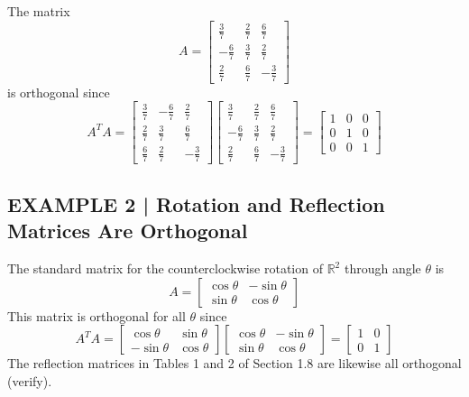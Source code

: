 \documentclass{article}
\theoremstyle{mystyle}
\begin{document}
The matrix
\[
  A = \begin{bmatrix}
        \tfrac{3}{7} & \tfrac{2}{7} & \tfrac{6}{7}\\[4pt]
        -\tfrac{6}{7} & \tfrac{3}{7} & \tfrac{2}{7}\\[4pt]
        \tfrac{2}{7} & \tfrac{6}{7} & -\tfrac{3}{7}
      \end{bmatrix}
\]
is orthogonal since
\[
  A^T A =
  \begin{bmatrix}
    \tfrac{3}{7} & -\tfrac{6}{7} & \tfrac{2}{7}\\[4pt]
    \tfrac{2}{7} & \tfrac{3}{7} & \tfrac{6}{7}\\[4pt]
    \tfrac{6}{7} & \tfrac{2}{7} & -\tfrac{3}{7}
  \end{bmatrix}
  \begin{bmatrix}
    \tfrac{3}{7} & \tfrac{2}{7} & \tfrac{6}{7}\\[4pt]
    -\tfrac{6}{7} & \tfrac{3}{7} & \tfrac{2}{7}\\[4pt]
    \tfrac{2}{7} & \tfrac{6}{7} & -\tfrac{3}{7}
  \end{bmatrix}
  = \begin{bmatrix}1&0&0\\0&1&0\\0&0&1\end{bmatrix}
\]

\subsection*{EXAMPLE 2 | Rotation and Reflection Matrices Are Orthogonal}

The standard matrix for the counterclockwise rotation of $\mathbb{R}^2$ through angle $\theta$ is
\[
  A = \begin{bmatrix}\cos\theta & -\sin\theta\\\sin\theta & \cos\theta\end{bmatrix}
\]
This matrix is orthogonal for all $\theta$ since
\[
  A^T A = \begin{bmatrix}\cos\theta & \sin\theta\\-\sin\theta & \cos\theta\end{bmatrix}
           \begin{bmatrix}\cos\theta & -\sin\theta\\\sin\theta & \cos\theta\end{bmatrix}
         = \begin{bmatrix}1&0\\0&1\end{bmatrix}
\]
The reflection matrices in Tables 1 and 2 of Section 1.8 are likewise all orthogonal (verify).
\end{document}
